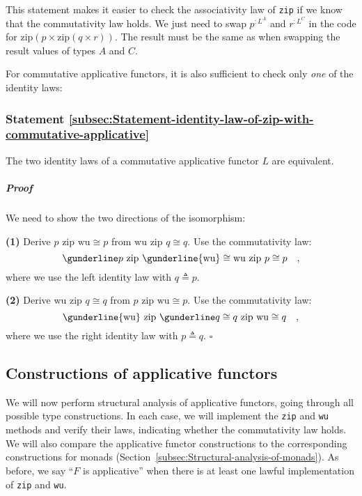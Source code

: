 This statement makes it easier to check the associativity law of \lstinline!zip!
if we know that the commutativity law holds. We just need to swap
$p^{:L^{A}}$ and $r^{:L^{C}}$ in the code for $\text{zip}\left(p\times\text{zip}\left(q\times r\right)\right)$.
The result must be the same as when swapping the result values of
types $A$ and $C$.

For commutative applicative functors, it is also sufficient to check
only \emph{one} of the identity laws:

\subsubsection{Statement \label{subsec:Statement-identity-law-of-zip-with-commutative-applicative}\ref{subsec:Statement-identity-law-of-zip-with-commutative-applicative}}

The two identity laws of a commutative applicative functor $L$ are
equivalent.

\subparagraph{Proof}

We need to show the two directions of the isomorphism: 

\textbf{(1)} Derive $p\,\,\text{zip}\,\,\text{wu}\cong p$ from $\text{wu}\,\,\text{zip}\,\,q\cong q$.
Use the commutativity law:
\[
\gunderline p\,\,\text{zip}\,\,\gunderline{\text{wu}}\cong\text{wu}\,\,\text{zip}\,\,p\cong p\quad,
\]
where we use the left identity law with $q\triangleq p$.

\textbf{(2)} Derive $\text{wu}\,\,\text{zip}\,\,q\cong q$ from $p\,\,\text{zip}\,\,\text{wu}\cong p$.
Use the commutativity law:
\[
\gunderline{\text{wu}}\,\,\text{zip}\,\,\gunderline q\cong q\,\,\text{zip}\,\,\text{wu}\cong q\quad,
\]
where we use the right identity law with $p\triangleq q$. $\square$

\subsection{Constructions of applicative functors\label{subsec:Constructions-of-applicative-functors}}

We will now perform structural analysis of applicative functors, going
through all possible type constructions. In each case, we will implement
the \lstinline!zip! and \lstinline!wu! methods and verify their
laws, indicating whether the commutativity law holds. We will also
compare the applicative functor constructions to the corresponding
constructions for monads (Section~\ref{subsec:Structural-analysis-of-monads}).
As before, we say \textsf{``}$F$ is applicative\textsf{''} when there is at least
one lawful implementation of \lstinline!zip! and \lstinline!wu!.

